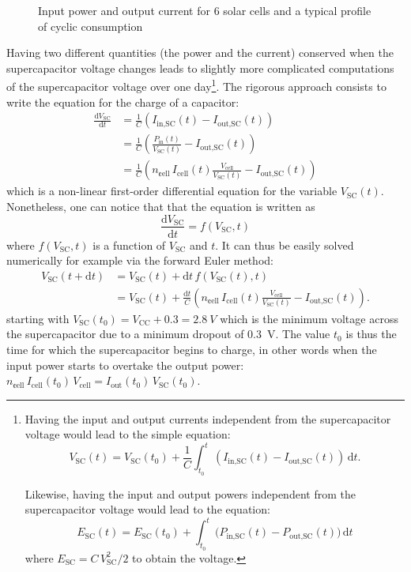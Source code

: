 \documentclass{EPL-master-thesis-covers-EN}
\newcommand{\te}[1]{\textrm{#1}}
\begin{document}
\begin{figure}[H]
    \centering
    
    \caption{Input power and output current for 6 solar cells and a typical profile of cyclic consumption}
    \label{fig:P_in_I_out}
\end{figure}

Having two different quantities (the power and the current) conserved when the supercapacitor voltage changes leads to slightly more complicated computations of the supercapacitor voltage over one day\footnote{Having the input and output currents independent from the supercapacitor voltage would lead to the simple equation: $$V_\te{SC}(t) = V_\te{SC}(t_0) + \frac{1}{C} \int_{t_0}^t (I_\te{in,SC}(t) - I_\te{out,SC}(t))\, \te{d}t.$$

Likewise, having the input and output powers independent from the supercapacitor voltage would lead to the equation: $$E_\te{SC}(t) = E_\te{SC}(t_0) + \int_{t_0}^t \big(P_\te{in,SC}(t) - P_\te{out,SC}(t)\big)\, \te{d}t$$ where $E_\te{SC} = C\, V_\te{SC}^2 / 2$ to obtain the voltage.}. The rigorous approach consists to write the equation for the charge of a capacitor:
\begin{align*}
 \frac{\te{d}V_\te{SC}}{\te{d}t} &= \frac{1}{C} \left( I_\te{in,SC}(t) - I_\te{out,SC}(t) \right) \\
 &= \frac{1}{C} \left( \frac{P_\te{in}(t)}{V_\te{SC}(t)} - I_\te{out,SC}(t) \right) \\
 &= \frac{1}{C} \left( n_\te{¢ell} \, I_\te{cell}(t) \frac{V_\te{cell}}{V_\te{SC}(t)} - I_\te{out,SC}(t) \right)
\end{align*}
which is a non-linear first-order differential equation for the variable $V_\te{SC}(t)$. Nonetheless, one can notice that that the equation is written as
\[
 \frac{\te{d}V_\te{SC}}{\te{d}t} = f(V_\te{SC}, t)
\]
where $f(V_\te{SC}, t)$ is a function of $V_\te{SC}$ and $t$. It can thus be easily solved numerically for example via the forward Euler method: 
\begin{align*}
 V_\te{SC}(t + \te{d}t) &= V_\te{SC}(t) + \te{d}t \, f(V_\te{SC}(t), t) \\
 &= V_\te{SC}(t) + \frac{\te{d}t}{C} \left( n_\te{¢ell} \, I_\te{cell}(t) \frac{V_\te{cell}}{V_\te{SC}(t)} - I_\te{out,SC}(t) \right).
\end{align*}
starting with $V_\te{SC}(t_0) = V_\te{CC} + 0.3 = \SI{2.8}{V}$ which is the minimum voltage across the supercapacitor due to a minimum dropout of \SI{0.3}{V}. The value $t_0$ is thus the time for which the supercapacitor begins to charge, in other words when the input power starts to overtake the output power: $n_\te{¢ell} \, I_\te{cell}(t_0)\,V_\te{cell} = I_\te{out}(t_0) \, V_\te{SC}(t_0)$.
\end{document}
